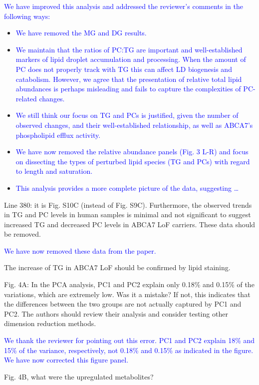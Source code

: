 \textcolor{blue}{We have improved this analysis and addressed the reviewer’s comments in the following ways:}
\begin{itemize}
	\item \textcolor{blue}{We have removed the MG and DG results.}
	\item \textcolor{blue}{We maintain that the ratios of PC:TG are important and well-established markers of lipid droplet accumulation and processing. When the amount of PC does not properly track with TG this can affect LD biogenesis and catabolism. However, we agree that the presentation of relative total lipid abundances is perhaps misleading and fails to capture the complexities of PC-related changes.}
	\item \textcolor{blue}{We still think our focus on TG and PCs is justified, given the number of observed changes, and their well-established relationship, as well as ABCA7’s phospholipid efflux activity.}
	\item \textcolor{blue}{We have now removed the relative abundance panels (Fig. 3 L-R) and focus on dissecting the types of perturbed lipid species (TG and PCs) with regard to length and saturation.}
	\item \textcolor{blue}{This analysis provides a more complete picture of the data, suggesting …}
\end{itemize}

Line 380: it is Fig. S10C (instead of Fig. S9C). Furthermore, the observed trends in TG and PC levels in human samples is minimal and not significant to suggest increased TG and decreased PC levels in ABCA7 LoF carriers. These data should be removed.
 
\textcolor{blue}{We have now removed these data from the paper.}

The increase of TG in ABCA7 LoF should be confirmed by lipid staining.

Fig. 4A: In the PCA analysis, PC1 and PC2 explain only 0.18\% and 0.15\% of the variations, which are extremely low. Was it a mistake? If not, this indicates that the differences between the two groups are not actually captured by PC1 and PC2. The authors should review their analysis and consider testing other dimension reduction methods.

\textcolor{blue}{We thank the reviewer for pointing out this error. PC1 and PC2 explain 18\% and 15\% of the variance, respectively, not 0.18\% and 0.15\% as indicated in the figure. We have now corrected this figure panel.}

Fig. 4B, what were the upregulated metabolites?

